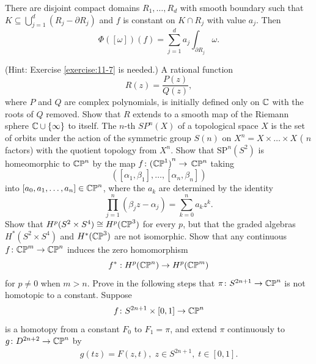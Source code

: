 \begin{enumerate}[label=\theexercise.\arabic*.,ref=\theexercise.\arabic*,leftmargin=2.7em]
    There are disjoint compact domains ${R}_{1},\ldots,{R}_{d}$ with smooth boundary such that $K \subseteq \bigcup_{{j = 1}}^{d}( {{R}_{j}- \partial {R}_{j}})$ and $f$ is constant on $K \cap  {R}_{j}$ with value ${a}_{j}$. Then
    \[
      \Phi ( [  \omega ]  ) ( f)  = \sum_{{j = 1}}^{d}{a}_{j}\int_{\partial {R}_{j}}\omega.
    \]
    \par(Hint: Exercise \ref{exercise:11-7} is needed.)
  \newchap[14]
  \NewItem A rational function
    \[
      R( z)  = \frac{P( z) }{Q( z) },
    \]
    where $P$ and $Q$ are complex polynomials, is initially defined only on $\mathbb{C}$ with the roots of $Q$ removed. Show that $R$ extends to a smooth map of the Riemann sphere $\mathbb{C} \cup  \{ \infty \}$ to itself.
  \NewItem The $n$-th  $S\!P^{n}(X)$ of a topological space $X$ is the set of orbits under the action of the symmetric group $S( n)$ on ${X}^{n} = X \times  \ldots  \times  X$ ( $n$ factors) with the quotient topology from ${X}^{n}$.
    Show that ${\mathrm{{SP}}}^{n}( {S}^{2})$ is homeomorphic to ${\mathbb{{CP}}}^{n}$ by the map $f\colon {( {\ensuremath{\mathbb{{CP}}}}^{1}) }^{n} \rightarrow$  ${\mathbb{{CP}}}^{n}$ taking
    \[
      ( {[  {{\alpha }_{1},{\beta }_{1}}] ,\ldots,[  {{\alpha }_{n},{\beta }_{n}}]  })
    \]
    into $[  {{a}_{0},{a}_{1},\ldots,{a}_{n}}]   \in  {\ensuremath{\mathbb{{CP}}}}^{n}$, where the ${a}_{k}$ are determined by the identity
    \[
      \mathop{\prod }\limits_{{j = 1}}^{n}( {{\beta }_{j}z- {\alpha }_{j}})  = \sum_{{k = 0}}^{n}{a}_{k}{z}^{k}.
    \]
  \NewItem Show that ${H}^{p}( {{S}^{2} \times  {S}^{4}})  \cong  {H}^{p}( {\mathbb{{CP}}}^{3})$ for every $p$, but that the graded algebras ${H}^*( {{S}^{2} \times  {S}^{4}})$ and ${H}^*( {\mathbb{{CP}}}^{3})$ are not isomorphic.
  \NewItem Show that any continuous $f\colon {\ensuremath{\mathbb{{CP}}}}^{m} \rightarrow  {\ensuremath{\mathbb{{CP}}}}^{n}$ induces the zero homomorphism
    \[
      {f}^* : {H}^{p}( {\mathbb{{CP}}}^{n})  \rightarrow  {H}^{p}( {\mathbb{{CP}}}^{m})
    \]
    for $p \neq  0$ when $m > n$.
  \NewItem Prove in the following steps that $\pi\colon  {S}^{{2n} + 1} \rightarrow  {\ensuremath{\mathbb{{CP}}}}^{n}$ is not homotopic to a constant. Suppose
    \[
      f\colon {S}^{{2n} + 1} \times  [  {0,1}]   \rightarrow  {\ensuremath{\mathbb{{CP}}}}^{n}
    \]
    is a homotopy from a constant ${F}_{0}$ to ${F}_{1} = \pi$, and extend $\pi$ continuously to $g\colon {D}^{{2n} + 2} \rightarrow  {\ensuremath{\mathbb{{CP}}}}^{n}$ by
    \begin{align*}%
      g( {tz})  = F( {z,t}),\;z \in  {S}^{{2n} + 1},\;t \in  [  {0,1}] .
    \end{align*}
    

\end{enumerate}
